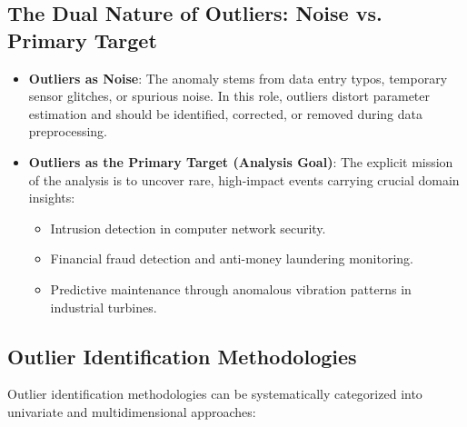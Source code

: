 \subsection{The Dual Nature of Outliers: Noise vs. Primary Target}
\begin{itemize}
    \item \textbf{Outliers as Noise}: The anomaly stems from data entry typos, temporary sensor glitches, or spurious noise. In this role, outliers distort parameter estimation and should be identified, corrected, or removed during data preprocessing.
    \item \textbf{Outliers as the Primary Target (Analysis Goal)}: The explicit mission of the analysis is to uncover rare, high-impact events carrying crucial domain insights:
    \begin{itemize}[noitemsep]
        \item Intrusion detection in computer network security.
        \item Financial fraud detection and anti-money laundering monitoring.
        \item Predictive maintenance through anomalous vibration patterns in industrial turbines.
    \end{itemize}
\end{itemize}

\subsection{Outlier Identification Methodologies}

Outlier identification methodologies can be systematically categorized into univariate and multidimensional approaches:

